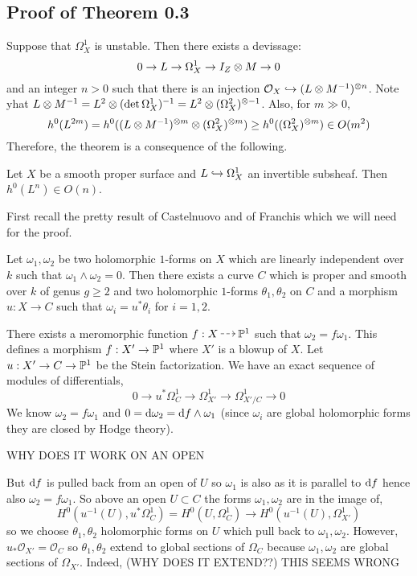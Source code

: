\documentclass[12pt]{article}
\newcommand{\cO}{\mathcal{O}}
\begin{document}
\subsection{Proof of Theorem 0.3}

Suppose that $\Omega_X^1$ is unstable. Then there exists a devissage:
\[ 0 \to L \to \Omega^1_X \to I_Z \ot M \to 0 \]
and an integer $n > 0$ such that there is an injection $\cO_X \embed (L \ot M^{-1})^{\ot n}$. Note yhat $L \ot M^{-1}  = L^2 \ot (\det{\Omega^1_X})^{-1} = L^2 \ot (\Omega_X^2)^{\ot -1}$. Also, for $m \gg 0$,
\[ h^0(L^{2m}) = h^0((L \ot M^{-1})^{\ot m} \ot (\Omega^2_X)^{\ot m}) \ge h^0((\Omega_X^2)^{\ot m}) \in O(m^2) \]
Therefore, the theorem is a consequence of the following.

\begin{theorem}[Bogomolov]
Let $X$ be a smooth proper surface and $L \embed \Omega_X^1$ an invertible subsheaf. Then $h^0(L^n) \in O(n)$. 
\end{theorem}

First recall the pretty result of Castelnuovo and of Franchis which we will need for the proof.

\begin{lemma}[4, 12]
Let $\omega_1, \omega_2$ be two holomorphic $1$-forms on $X$ which are linearly independent over $k$ such that $\omega_1 \wedge \omega_2 = 0$. Then there exists a curve $C$ which is proper and smooth over $k$ of genus $g \ge 2$ and two holomorphic $1$-forms $\theta_1, \theta_2$ on $C$ and a morphism $u : X \to C$ such that $\omega_i = u^* \theta_i$ for $i = 1,2$.
\end{lemma}

There exists a meromorphic function $f : X \rat \P^1$ such that $\omega_2 = f \omega_1$. This defines a morphism $f : X' \to \P^1$ where $X'$ is a blowup of $X$. Let $u : X' \to C \to \P^1$ be the Stein factorization.  We have an exact sequence of modules of differentials,
\[ 0 \to u^* \Omega^1_C \to \Omega^1_{X'} \to \Omega^1_{X'/C} \to 0 \]
We know $\omega_2 = f \omega_1$ and $0 = \d{\omega_2} = \d{f} \wedge \omega_1$ (since $\omega_i$ are global holomorphic forms they are closed by Hodge theory). 

{\color{red} WHY DOES IT WORK ON AN OPEN}

But $\d{f}$ is pulled back from an open of $U$ so $\omega_1$ is also as it is parallel to $\d{f}$ hence also $\omega_2 = f \omega_1$. So above an open $U \subset C$ the forms $\omega_1, \omega_2$ are in the image of,
\[ H^0(u^{-1}(U), u^* \Omega_C^1) = H^0(U, \Omega^1_C) \to H^0(u^{-1}(U), \Omega^1_{X'}) \]
so we choose $\theta_1, \theta_2$ holomorphic forms on $U$ which pull back to $\omega_1, \omega_2$. However, $u_* \cO_{X'} = \cO_{C}$ so $\theta_1, \theta_2$ extend to global sections of $\Omega_C$ because $\omega_1, \omega_2$ are global sections of $\Omega_{X'}$. Indeed,
{\color{red} (WHY DOES IT EXTEND??) THIS SEEMS WRONG}
\end{document}
